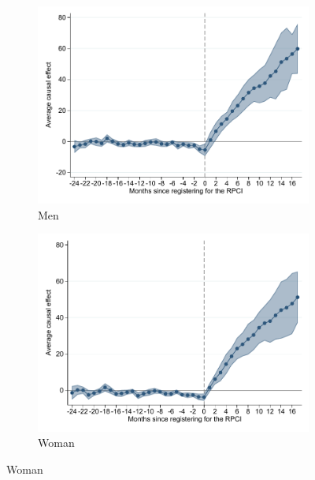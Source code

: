 \documentclass[oneside,11pt]{article}
\begin{document}
\begin{figure}[H]
    \caption{Event studies - RPCI effect on wage by worker characteristics}
    \label{event_study_wage_worker_characteristics}
    \begin{center}
    
    \begin{subfigure}{0.49\textwidth}
    \caption{Men}
    \includegraphics[width=\textwidth]{04_Figures/muestra_10porciento/event_study_sal_cierre_chaisemartin_sexo_0.pdf}
    \end{subfigure}
    \begin{subfigure}{0.49\textwidth}
    \caption{Woman}
    \includegraphics[width=\textwidth]{04_Figures/muestra_10porciento/event_study_sal_cierre_chaisemartin_sexo_1.pdf}
    \end{subfigure}
    

\end{center}
\end{figure}
\end{document}
